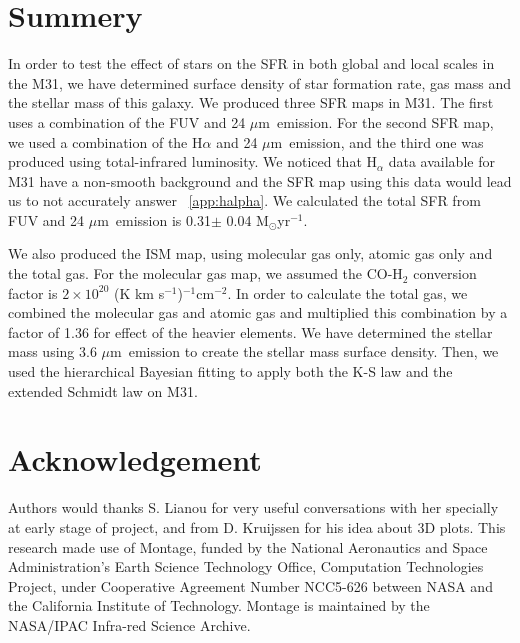 \documentclass[useAMS,usenatbib]{mn2e}
\newcommand \um    {$\mu$m\ }
\begin{document}
\section{Summery}
In order to test the effect of stars on the SFR in both global and local scales in the M31, we have determined surface density of star formation rate, gas mass and the stellar mass of this galaxy. We produced three SFR maps in M31. The first uses a combination of the FUV and 24 \um emission. For the second SFR map, we used a combination of the H$\alpha$ and 24 \um emission, and the third one was produced using total-infrared luminosity. We noticed that H$_\alpha$ data available for M31 have a non-smooth background and the SFR map using this data would lead us to not accurately answer ~\ref{app:halpha}. We calculated the total SFR from FUV and 24 \um emission is 0.31$\pm$ 0.04 M$_{\odot}$yr$^{-1}$.

We also produced the ISM map, using molecular gas only, atomic gas only and the total gas. For the molecular gas map, we assumed the CO-H$_2$ conversion factor is $2 \times 10^{20}$ (K km s$^{-1}$)$^{-1}$cm$^{-2}$. In order to calculate the total gas, we combined the molecular gas and atomic gas and multiplied this combination by a factor of 1.36 for effect of the heavier elements. We have determined the stellar mass using 3.6 \um emission to create the stellar mass surface density. Then, we used the hierarchical Bayesian fitting to apply both the K-S law and the extended Schmidt law on M31.


\section*{Acknowledgement}
Authors would thanks S. Lianou for very useful conversations with her specially at early stage of project, and from D. Kruijssen for his idea about 3D plots.
This research made use of Montage, funded by the National Aeronautics and Space Administration's Earth Science Technology Office, Computation Technologies Project, under Cooperative Agreement Number NCC5-626 between NASA and the California Institute of Technology. Montage is maintained by the NASA/IPAC Infra-red Science Archive.
\newpage
\newpage

\end{document}
